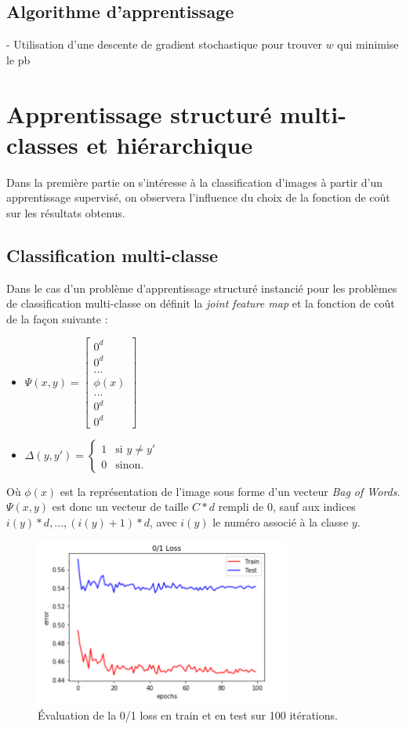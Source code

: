\documentclass[a4paper]{article}
\begin{document}
\subsection{Algorithme d'apprentissage}
- Utilisation d'une descente de gradient stochastique pour trouver $w$ qui minimise le pb

\section{Apprentissage structuré multi-classes et hiérarchique}
Dans la première partie on s'intéresse à la classification d'images à partir d'un apprentissage supervisé, on observera l'influence du choix de la fonction de coût sur les résultats obtenus.

\subsection{Classification multi-classe}
Dans le cas d'un problème d'apprentissage structuré instancié pour les problèmes de classification multi-classe on définit la \textit{joint feature map} et la fonction de coût de la façon suivante : 
\begin{itemize}
\item $\Psi(x,y) = \begin{bmatrix}  0^d\\0^d\\...\\ \phi(x) \\...\\0^d\\0^d \end{bmatrix} $   
\item $\Delta(y,y') = \left\{
    \begin{array}{ll}
        1 & \mbox{si } y \neq y' \\
        0 & \mbox{sinon.}
    \end{array}
\right.$
\end{itemize}
Où $\phi(x)$ est la représentation de l'image sous forme d'un vecteur \textit{Bag of Words}.  $\Psi(x,y)$ est donc un vecteur de taille $C * d$ rempli de $0$, sauf aux indices $i(y) * d, ..., (i(y) + 1) *d$, avec $i(y)$ le numéro associé à la classe $y$.

\begin{figure}
\centering
\includegraphics[width=0.75\textwidth]{error.png}
\caption{\label{fig:data} Évaluation de la 0/1 loss en train et en test sur 100 itérations.}
\end{figure}
\end{document}
